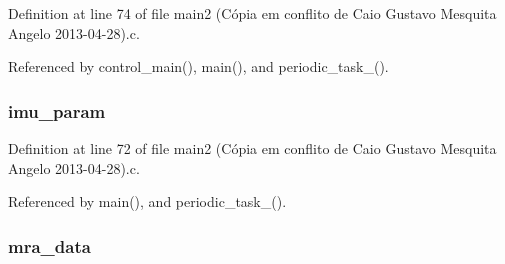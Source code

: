 Definition at line 74 of file main2 (\-Cópia em conflito de Caio Gustavo Mesquita Angelo 2013-\/04-\/28).\-c.



Referenced by control\-\_\-main(), main(), and periodic\-\_\-task\-\_().

\hypertarget{main2_01_07C_xC3_xB3pia_01em_01conflito_01de_01Caio_01Gustavo_01Mesquita_01Angelo_012013-04-28_08_8c_a9c6b2109fb9402446f92995db60951b5}{
\subsubsection[{imu\-\_\-param}]{ imu\-\_\-param}}\label{main2_01_07C_xC3_xB3pia_01em_01conflito_01de_01Caio_01Gustavo_01Mesquita_01Angelo_012013-04-28_08_8c_a9c6b2109fb9402446f92995db60951b5}


Definition at line 72 of file main2 (\-Cópia em conflito de Caio Gustavo Mesquita Angelo 2013-\/04-\/28).\-c.



Referenced by main(), and periodic\-\_\-task\-\_().

\hypertarget{main2_01_07C_xC3_xB3pia_01em_01conflito_01de_01Caio_01Gustavo_01Mesquita_01Angelo_012013-04-28_08_8c_abc42e18d2909e9bc119316283f4ed9db}{
\subsubsection[{mra\-\_\-data}]{ mra\-\_\-data}}\label{main2_01_07C_xC3_xB3pia_01em_01conflito_01de_01Caio_01Gustavo_01Mesquita_01Angelo_012013-04-28_08_8c_abc42e18d2909e9bc119316283f4ed9db}


